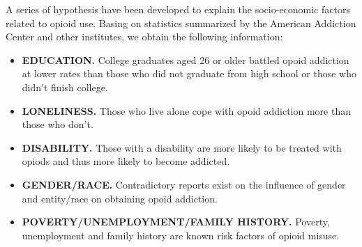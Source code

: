 A series of hypothesis have been developed to explain the socio-economic factors related to opioid use. Basing on statistics summarized by the American Addiction Center and other institutes\cite{10}\cite{11}, we obtain the following information:
\begin{itemize}
	\item \textbf{EDUCATION.} College graduates aged 26 or older battled opoid addiction at lower rates than those who did not graduate from high school or those who didn’t finish college.
	\item \textbf{LONELINESS.} Those who live alone cope with opoid addiction more than those who don't.
	\item \textbf{DISABILITY.} Those with a disability are more likely to be treated with opiods and thus more likely to become addicted.
	\item \textbf{GENDER/RACE.} Contradictory reports exist on the influence of gender and entity/race on obtaining opoid addiction. 
	\item \textbf{POVERTY/UNEMPLOYMENT/FAMILY HISTORY.} Poverty, unemployment and family history are known risk factors of opioid misuse.
\end{itemize}


\begin{comment}
he above prior knowledge imply that education, loneliness, poverty, unemployment and family addiction history are the most influential factors. Contradicting reports regarding gender and entity factors allow us to assume that they play a minor part in opioid use.

Correspondingly, in the dataset, we choose \textit{\bfseries HC03\_VC85}(low educational background), \textit{\bfseries HC03\_VC14}(Nonfamily households - Householder living alone) and \textit{\bfseries HC01\_VC103}(DISABILITY STATUS OF THE CIVILIAN NONINSTITUTIONALIZED POPULATION - Total Civilian Noninstitutionalized Population). Let them be $Y_1$, $Y_2$ and $Y_3$ Further investigation showed that \textit{\bfseries HC01\_VC103} and all other disability-relevant factors were missing and therefore removed in the data cleansing proceidure. Therefore, we attempt to obtain $\lambda$ through linear regression by fitting
\begin{equation}
\lambda = \beta_1 Y_1 + \beta_2 Y_2
\end{equation}
\subsubsection{Linear Regression}
\end{comment}



